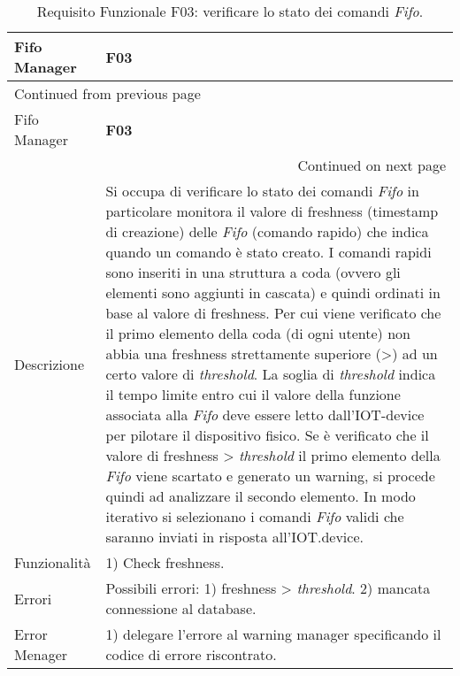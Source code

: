 \documentclass[onecolumn,a4paper]{article}
\begin{document}
\begin{longtable}{|p{3cm}|p{10cm}|}
\caption{Requisito Funzionale F03: verificare lo stato dei comandi \emph{Fifo}.}
\\
\cellcolor{grey!15}Fifo Manager & \cellcolor{grey!15} \textbf{F03}\\
\hline
\endfirsthead
\multicolumn{2}{l}{Continued from previous page} \\
\hline

\cellcolor{grey!15}Fifo Manager & \cellcolor{grey!15} \textbf{F03} \\

\hline
\endhead
\hline\multicolumn{2}{r}{Continued on next page} \\
\endfoot
\endlastfoot
\hline
Descrizione & Si occupa di verificare lo stato dei comandi \emph{Fifo} in particolare monitora il valore di freshness (timestamp di creazione) delle \emph{Fifo} (comando rapido) che indica quando un comando è stato creato. I comandi rapidi sono inseriti in una struttura a coda (ovvero gli elementi sono aggiunti in cascata) e quindi ordinati in base al valore di freshness. Per cui viene verificato che il primo elemento della coda (di ogni utente) non abbia una freshness strettamente superiore (>) ad un certo valore di \emph{threshold}. La soglia di \emph{threshold} indica il tempo limite entro cui il valore della funzione associata alla \emph{Fifo} deve essere letto dall'IOT-device per pilotare il dispositivo fisico. Se è verificato che il valore di freshness > \emph{threshold} il primo elemento della \emph{Fifo} viene scartato e generato un warning, si procede quindi ad analizzare il secondo elemento. In modo iterativo si selezionano i comandi \emph{Fifo} validi che saranno inviati in risposta all'IOT.device.\\
\hline
Funzionalità & 1) Check freshness.\\
\hline
Errori & Possibili errori: 1) freshness > \emph{threshold}. 2) mancata connessione al database.\\
\hline
Error Menager & 1) delegare l'errore al warning manager specificando il codice di errore riscontrato.\\
\hline
\end{longtable}
\end{document}
